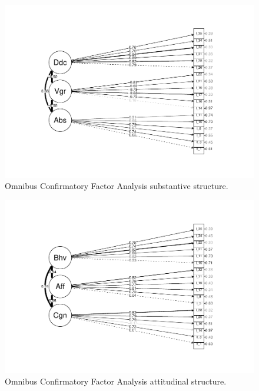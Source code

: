 \documentclass[
  man]{apa6}
\begin{document}
\begin{figure}
\centering
\includegraphics{EngagementPaper2_files/figure-latex/semplotsub-1.pdf}
\caption{\label{fig:semplotsub}Omnibus Confirmatory Factor Analysis substantive structure.}
\end{figure}

\begin{figure}
\centering
\includegraphics{EngagementPaper2_files/figure-latex/semplotatt-1.pdf}
\caption{\label{fig:semplotatt}Omnibus Confirmatory Factor Analysis attitudinal structure.}
\end{figure}
\end{document}
